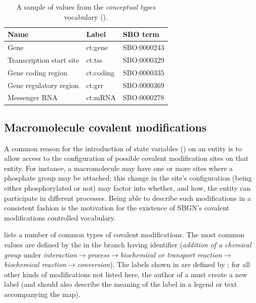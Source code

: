 \begin{table}[htb]
  \centering
  \begin{tabular}{l>{\ttfamily}l>{\ttfamily}l}
    \toprule
    \textbf{Name}              & \textbf{\rmfamily Label} & \textbf{\rmfamily SBO term} \\
    \midrule
    Gene                      & ct:gene   & SBO:0000243\\
    Transcription start site  & ct:tss    & SBO:0000329\\
    Gene coding region        & ct:coding & SBO:0000335\\
    Gene regulatory region    & ct:grr    & SBO:0000369\\
    Messenger RNA             & ct:mRNA   & SBO:0000278\\
    \bottomrule
  \end{tabular}
  \caption{A sample of values from the \emph{conceptual types} vocabulary
    ().}
  \label{tab:techref:conceptual-types-cv}
\end{table}


\subsection{Macromolecule covalent modifications}
\label{sec:techref:covalent-mod-cv}

A common reason for the introduction of state variables
() on an entity is to allow access to the
configuration of possible covalent modification sites on that entity.
For instance, a macromolecule may have one or more sites where a
phosphate group may be attached; this change in the site's
configuration (\ie being either phosphorylated or not) may factor into
whether, and how, the entity can participate in different processes.
Being able to describe such modifications in a consistent fashion is
the motivation for the existence of SBGN's covalent modifications
controlled vocabulary.

 lists a number of common types of covalent
modifications.  The most common values are defined by the \sbo in the
branch having identifier  (\emph{addition of a
  chemical group} under
\emph{interaction}$\rightarrow$\emph{process}$\rightarrow$\emph{biochemical
  or transport reaction}$\rightarrow$\\\emph{biochemical
  reaction}$\rightarrow$\emph{conversion}).  The labels shown in
 are defined by \SBGNPDLone; for all other kinds
of modifications not listed here, the author of a \PD must create a
new label (and should also describe the meaning of the label in a
legend or text accompanying the map).

